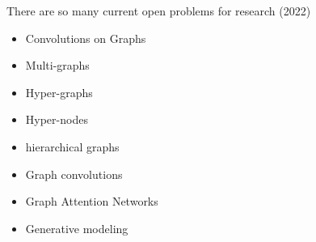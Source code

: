 There are so many current open problems for research (2022)
\begin{itemize}
	\item Convolutions on Graphs \cite{daigavane2021understanding}
	\item Multi-graphs
	\item Hyper-graphs
	\item Hyper-nodes
	\item hierarchical graphs
	\item Graph convolutions
	\item Graph Attention Networks
	\item Generative modeling
\end{itemize}